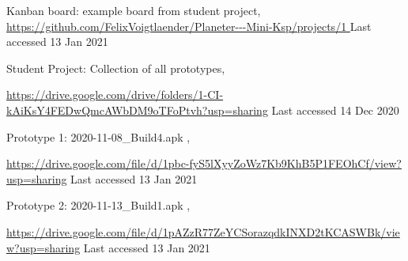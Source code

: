 \documentclass[runningheads]{llncs}
\begin{document}
\begin{thebibliography}{8}
Kanban board: example board from student project, \url{https://github.com/FelixVoigtlaender/Planeter---Mini-Ksp/projects/1
} Last accessed 13 Jan 2021

Student Project: Collection of all prototypes, 

\url{https://drive.google.com/drive/folders/1-CI-kAiKsY4FEDwQmcAWbDM9oTFoPtvh?usp=sharing} Last accessed 14 Dec 2020


Prototype 1: 2020-11-08\_Build4.apk , 

\url{https://drive.google.com/file/d/1pbc-fyS5lXyyZoWz7Kb9KhB5P1FEOhCf/view?usp=sharing} Last accessed 13
Jan 2021


Prototype 2: 2020-11-13\_Build1.apk ,  

\url{https://drive.google.com/file/d/1pAZzR77ZeYCSorazqdkINXD2tKCASWBk/view?usp=sharing} Last accessed 13 Jan 2021


\end{thebibliography} 
\end{document}
